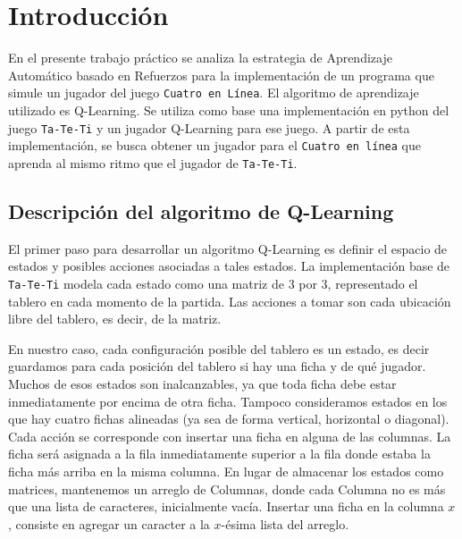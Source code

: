 \documentclass[10pt, a4paper]{article}
\begin{document}
\fecha{\today}


\maketitle
\tableofcontents
\newpage


\section{Introducción}


En el presente trabajo práctico se analiza la estrategia de Aprendizaje Automático basado en Refuerzos para la implementación de un programa que simule un jugador del juego \texttt{Cuatro en Línea}. El algoritmo de aprendizaje utilizado es Q-Learning. Se utiliza como base una implementación en python del juego \texttt{Ta-Te-Ti} y un jugador Q-Learning para ese juego. A partir de esta implementación, se busca obtener un jugador para el \texttt{Cuatro en línea} que aprenda al mismo ritmo que el jugador de \texttt{Ta-Te-Ti}.


\subsection{Descripción del algoritmo de Q-Learning}


El primer paso para desarrollar un algoritmo Q-Learning es definir el espacio de estados y posibles acciones asociadas a tales estados. La implementación base de \texttt{Ta-Te-Ti} modela cada estado como una matriz de 3 por 3, representado el tablero en cada momento de la partida. Las acciones a tomar son cada ubicación libre del tablero, es decir, de la matriz.


En nuestro caso, cada configuración posible del tablero es un estado, es decir guardamos para cada posición del tablero si hay una ficha y de qué jugador. Muchos de esos estados son inalcanzables, ya que toda ficha debe estar inmediatamente por encima de otra ficha. Tampoco consideramos estados en los que hay cuatro fichas alineadas (ya sea de forma vertical, horizontal o diagonal). 
Cada acción se corresponde con insertar una ficha en alguna de las columnas. La ficha será asignada a la fila inmediatamente superior a la fila donde estaba la ficha más arriba en la misma columna. En lugar de almacenar los estados como matrices, mantenemos un arreglo de Columnas, donde cada Columna no es más que una lista de caracteres, inicialmente vacía. Insertar una ficha en la columna $x$, consiste en agregar un caracter a la $x$-ésima lista del arreglo.
\end{document}
